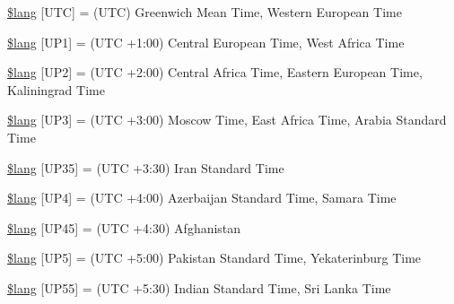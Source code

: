 \begin{DoxyCompactItemize}
\item 
\hyperlink{system_2language_2english_2date__lang_8php_ab153b3219e74743184b7dee67e86f9fc}{\$lang} \mbox{[}\textquotesingle{}U\+T\+C\textquotesingle{}\mbox{]} = \textquotesingle{}(U\+T\+C) Greenwich Mean Time, Western European Time\textquotesingle{}
\item 
\hyperlink{system_2language_2english_2date__lang_8php_a788996558e6c8cafd788a1fef6b0be4e}{\$lang} \mbox{[}\textquotesingle{}U\+P1\textquotesingle{}\mbox{]} = \textquotesingle{}(U\+T\+C +1\+:00) Central European Time, West Africa Time\textquotesingle{}
\item 
\hyperlink{system_2language_2english_2date__lang_8php_adfeba045961d07f8f30c0f1a7b8b4ff9}{\$lang} \mbox{[}\textquotesingle{}U\+P2\textquotesingle{}\mbox{]} = \textquotesingle{}(U\+T\+C +2\+:00) Central Africa Time, Eastern European Time, Kaliningrad Time\textquotesingle{}
\item 
\hyperlink{system_2language_2english_2date__lang_8php_a5eddd4b83edcbefcc883077949d40a67}{\$lang} \mbox{[}\textquotesingle{}U\+P3\textquotesingle{}\mbox{]} = \textquotesingle{}(U\+T\+C +3\+:00) Moscow Time, East Africa Time, Arabia Standard Time\textquotesingle{}
\item 
\hyperlink{system_2language_2english_2date__lang_8php_ad669ea69fd450762d029592b6ac64395}{\$lang} \mbox{[}\textquotesingle{}U\+P35\textquotesingle{}\mbox{]} = \textquotesingle{}(U\+T\+C +3\+:30) Iran Standard Time\textquotesingle{}
\item 
\hyperlink{system_2language_2english_2date__lang_8php_ad0131a14a1ede9328baf1a1827602f45}{\$lang} \mbox{[}\textquotesingle{}U\+P4\textquotesingle{}\mbox{]} = \textquotesingle{}(U\+T\+C +4\+:00) Azerbaijan Standard Time, Samara Time\textquotesingle{}
\item 
\hyperlink{system_2language_2english_2date__lang_8php_a7795735f3608127d726a4fca3f87dc79}{\$lang} \mbox{[}\textquotesingle{}U\+P45\textquotesingle{}\mbox{]} = \textquotesingle{}(U\+T\+C +4\+:30) Afghanistan\textquotesingle{}
\item 
\hyperlink{system_2language_2english_2date__lang_8php_a08236ffa5ff4db9f2bc023f5256fead1}{\$lang} \mbox{[}\textquotesingle{}U\+P5\textquotesingle{}\mbox{]} = \textquotesingle{}(U\+T\+C +5\+:00) Pakistan Standard Time, Yekaterinburg Time\textquotesingle{}
\item 
\hyperlink{system_2language_2english_2date__lang_8php_aa55a1ebecdfbd5e0c7e40c921b90cad2}{\$lang} \mbox{[}\textquotesingle{}U\+P55\textquotesingle{}\mbox{]} = \textquotesingle{}(U\+T\+C +5\+:30) Indian Standard Time, Sri Lanka Time\textquotesingle{}

\end{DoxyCompactItemize}
